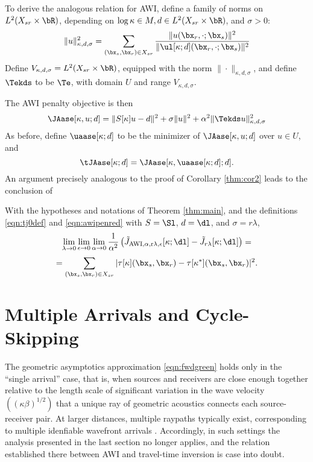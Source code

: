 To derive the analogous relation for AWI, define a family of norms on
$ L^2(X_{sr} \times \bR)$, depending on $\log \kappa \in M, d \in
L^2(X_{sr} \times \bR)$, and $\sigma >0$:
\begin{equation}
  \label{eqn:awinormdef}
  \|u\|^2_{\kappa,d,\sigma} = \sum_{(\bx_s,\bx_r) \in X_{sr}}\frac{\|u(\bx_r,\cdot;\bx_s)\|^2}{\|\ul[\kappa;d](\bx_r,\cdot;\bx_s)\|^2}
\end{equation}
Define $V_{\kappa,d,\sigma} = L^2(X_{sr} \times \bR)$, equipped with
the norm $\|\cdot\|_{\kappa,d,\sigma}$, and define $\Tekds$ to be
$\Te$, with domain $U$ and range $V_{\kappa,d,\sigma}$.

The AWI penalty objective is then
\begin{equation}
  \label{eqn:awipen}
  \JAase[\kappa,u;d] = \|S[\kappa]u-d\|^2 + \sigma\|u\|^2 + \alpha^2
  \|\Tekds u\|_{\kappa,d,\sigma}^2
\end{equation}
As before, define $\uaase[\kappa;d]$ to be the minimizer of
$\JAase[\kappa,u;d]$ over $u \in U$, and
\begin{equation}
  \label{eqn:awipenred}
  \tJAase[\kappa;d] =\JAase[\kappa,\uaase[\kappa;d];d].
\end{equation}
An argument precisely analogous to the proof of Corollary
\ref{thm:cor2} leads to the conclusion of
\begin{cor}
  \label{thm:cor3}
  With the hypotheses and notations of Theorem \ref{thm:main}, and the
  definitions \ref{eqn:tj0def} and \ref{eqn:awipenred} with $S=\Sl$,
  $d=\dl$, and $\sigma=r\lambda$,
  \[
  \lim_{\lambda \rightarrow 0}\lim_{\epsilon \rightarrow 0}\lim_{\alpha \rightarrow 0}
  \frac{1}{\alpha^2}\left(\tilde{J}_{\rm AWI,\alpha,r\lambda,\epsilon}[\kappa;\dl]-\tilde{J}_{r\lambda}[\kappa;\dl]\right)=
  \]
  \begin{equation}
    \label{eqn:cor3}
    = \sum_{(\bx_s,\bx_r) \in X_{sr}} |\tau[\kappa](\bx_s,\bx_r) - \tau[\kappa^*](\bx_s,\bx_r)|^2.
  \end{equation}
\end{cor}

\section{Multiple Arrivals and Cycle-Skipping}
The geometric asymptotics approximation \ref{eqn:fwdgreen} holds only
in the ``single arrival'' case, that is, when sources and receivers
are close enough together relative to the length scale of significant
variation in the wave velocity $((\kappa\beta)^{1/2})$ that a unique ray of
geometric acoustics connects each source-receiver pair. At larger
distances, multiple raypaths typically exist, corresponding to
multiple idenfiable wavefront arrivals \cite[]{Whi:82}. Accordingly, in such settings
the analysis presented in the last section no longer applies, and the
relation established there between AWI and travel-time inversion is
case into doubt.

